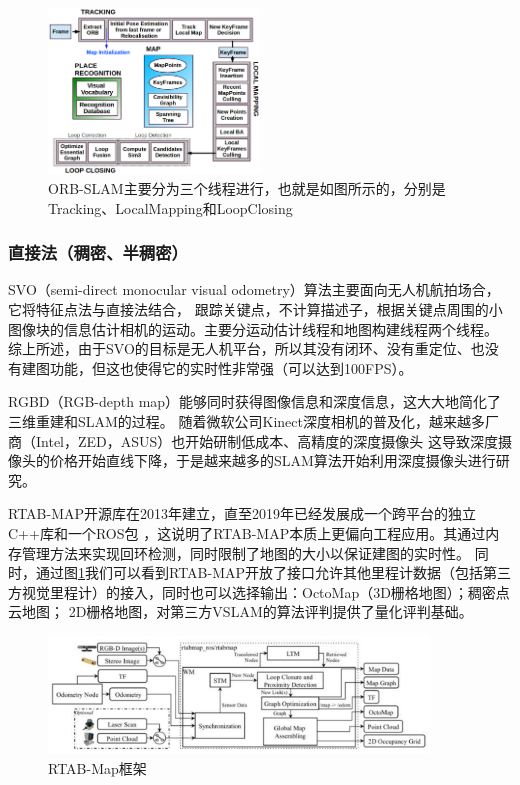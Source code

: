 \documentclass[cs4size,a4paper]{ctexart}
\numberwithin{equation}{section}
\numberwithin{table}{section}
\numberwithin{figure}{section}
\begin{document}
\begin{figure}[H]
        \centering
        \includegraphics[width=0.5\textwidth]{figure/orb.png}
        \caption{ORB-SLAM主要分为三个线程进行，也就是如图所示的，分别是Tracking、LocalMapping和LoopClosing\cite{murORB2}}
\end{figure}
\subsubsection{直接法（稠密、半稠密）}
SVO（semi-direct monocular visual odometry）算法\cite{6906584}主要面向无人机航拍场合，它将特征点法与直接法结合，
跟踪关键点，不计算描述子，根据关键点周围的小图像块的信息估计相机的运动。主要分运动估计线程和地图构建线程两个线程。
综上所述，由于SVO的目标是无人机平台，所以其没有闭环、没有重定位、也没有建图功能，但这也使得它的实时性非常强（可以达到100FPS）。

RGBD（RGB-depth map）能够同时获得图像信息和深度信息，这大大地简化了三维重建和SLAM的过程。
随着微软公司Kinect深度相机的普及化，越来越多厂商（Intel，ZED，ASUS）也开始研制低成本、高精度的深度摄像头
这导致深度摄像头的价格开始直线下降，于是越来越多的SLAM算法开始利用深度摄像头进行研究。

RTAB-MAP开源库\cite{doi:10.1002/rob.21831}在2013年建立，直至2019年已经发展成一个跨平台的独立C++库和一个ROS包
，这说明了RTAB-MAP本质上更偏向工程应用。其通过内存管理方法来实现回环检测，同时限制了地图的大小以保证建图的实时性。
同时，通过图\ref{octo}我们可以看到RTAB-MAP开放了接口允许其他里程计数据（包括第三方视觉里程计）的接入，同时也可以选择输出：OctoMap（3D栅格地图）\cite{octomap}；稠密点云地图\cite{pointcloud}；
2D栅格地图\cite{6942636}，对第三方VSLAM的算法评判提供了量化评判基础。
\begin{figure}[H]
        \centering
        \includegraphics[width=0.9\textwidth]{figure/rtab.png}
        \caption{RTAB-Map框架}
        \label{octo}
\end{figure}
\end{document}
